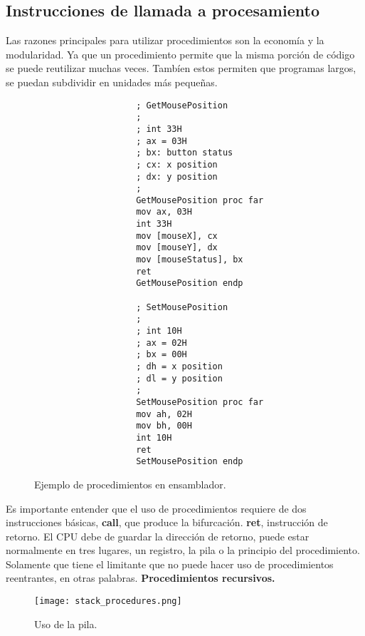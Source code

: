 \documentclass{article}
\begin{document}
\subsection*{Instrucciones de llamada a procesamiento}
Las razones principales para utilizar procedimientos son la econom\'{i}a
y la modularidad. Ya que un procedimiento permite que la misma porci\'{o}n
de c\'{o}digo se puede reutilizar muchas veces. Tamb\'{i}en estos permiten
que programas largos, se puedan subdividir en unidades m\'{a}s peque\~{n}as.

\begin{figure}[h]
    \begin{verbatim}
                    ; GetMousePosition
                    ;
                    ; int 33H
                    ; ax = 03H
                    ; bx: button status
                    ; cx: x position
                    ; dx: y position
                    ;
                    GetMousePosition proc far
                    mov ax, 03H
                    int 33H
                    mov [mouseX], cx
                    mov [mouseY], dx
                    mov [mouseStatus], bx
                    ret
                    GetMousePosition endp
                    
                    ; SetMousePosition
                    ;
                    ; int 10H
                    ; ax = 02H
                    ; bx = 00H
                    ; dh = x position
                    ; dl = y position
                    ;
                    SetMousePosition proc far
                    mov ah, 02H
                    mov bh, 00H
                    int 10H
                    ret
                    SetMousePosition endp
    \end{verbatim}
    \caption{Ejemplo de procedimientos en ensamblador.}
\end{figure}

Es importante entender que el uso de procedimientos requiere de 
dos instrucciones b\'{a}sicas, \textbf{call}, que produce la bifurcaci\'{o}n.
\textbf{ret}, instrucci\'{o}n de retorno. El CPU debe de guardar la direcci\'{o}n
de retorno, puede estar normalmente en tres lugares, un registro, la pila o
la principio del procedimiento. Solamente que tiene el limitante que no puede
hacer uso de procedimientos reentrantes, en otras palabras. \textbf{Procedimientos 
recursivos.}

\begin{figure}[h]
    \centering
    \texttt{[image: stack\_procedures.png]}
    \caption{Uso de la pila.
    \cite {stallings2006organización}}
\end{figure}
\end{document}
